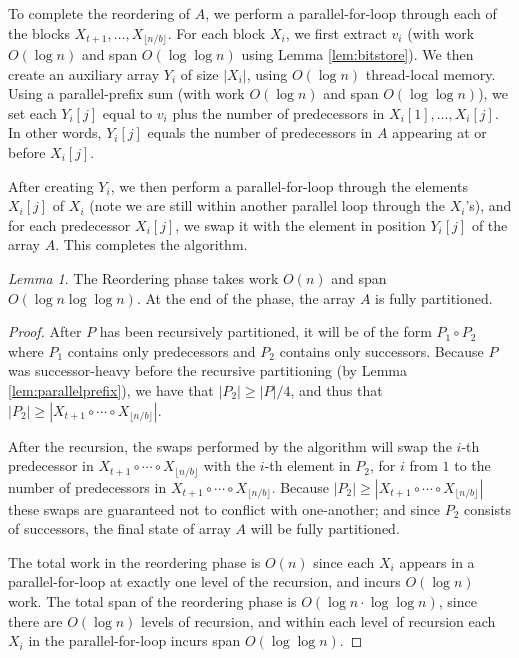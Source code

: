 \documentclass[11pt]{article}
\theoremstyle{remark}
\newtheorem{lemma}[thm]{Lemma}
\theoremstyle{remark}
\begin{document}
To complete the reordering of $A$, we perform a parallel-for-loop
through each of the blocks $X_{t + 1}, \ldots, X_{\lfloor n / b \rfloor}$. For each block
$X_i$, we first extract $v_i$ (with work $O(\log n)$ and span $O(\log
\log n)$ using Lemma \ref{lem:bitstore}). We then create an auxiliary
array $Y_i$ of size $|X_i|$, using $O(\log n)$ thread-local
memory. Using a parallel-prefix sum (with work $O(\log n)$ and span
$O(\log \log n)$), we set each $Y_i[j]$ equal to $v_i$ plus the number
of predecessors in $X_i[1], \ldots, X_i[j]$. In other words, $Y_i[j]$
equals the number of predecessors in $A$ appearing at or before
$X_i[j]$.

After creating $Y_i$, we then perform a parallel-for-loop through the
elements $X_i[j]$ of $X_i$ (note we are still within another parallel
loop through the $X_i$'s), and for each predecessor $X_i[j]$, we swap
it with the element in position $Y_i[j]$ of the array $A$. This
completes the algorithm.

\begin{lemma}
 The Reordering phase takes work $O(n)$ and span $O(\log n \log \log
 n)$. At the end of the phase, the array $A$ is fully partitioned.
\end{lemma}
\begin{proof}
  After $P$ has been recursively partitioned, it will be of the form
  $P_1 \circ P_2$ where $P_1$ contains only predecessors and $P_2$
  contains only successors. Because $P$ was successor-heavy before the
  recursive partitioning (by Lemma \ref{lem:parallelprefix}), we have
  that $|P_2| \ge |P| / 4$, and thus that
  $|P_2| \ge |X_{t + 1} \circ \cdots \circ X_{\lfloor n / b
    \rfloor}|$.

After the recursion, the swaps performed by the algorithm will swap
the $i$-th predecessor in $X_{t + 1} \circ \cdots \circ X_{\lfloor n /
  b \rfloor}$ with the $i$-th element in $P_2$, for $i$ from $1$ to
the number of predecessors in $X_{t + 1} \circ \cdots \circ X_{\lfloor
  n / b \rfloor}$. Because $|P_2| \ge |X_{t + 1} \circ \cdots \circ
X_{\lfloor n / b \rfloor}|$ these swaps are guaranteed not to conflict
with one-another; and since $P_2$ consists of successors, the final
state of array $A$ will be fully partitioned.

The total work in the reordering phase is $O(n)$ since each $X_i$
appears in a parallel-for-loop at exactly one level of the recursion,
and incurs $O(\log n)$ work. The total span of the reordering phase is
$O(\log n \cdot \log \log n)$, since there are $O(\log n)$ levels of
recursion, and within each level of recursion each $X_i$ in the
parallel-for-loop incurs span $O(\log \log n)$. 
\end{proof}
\end{document}
